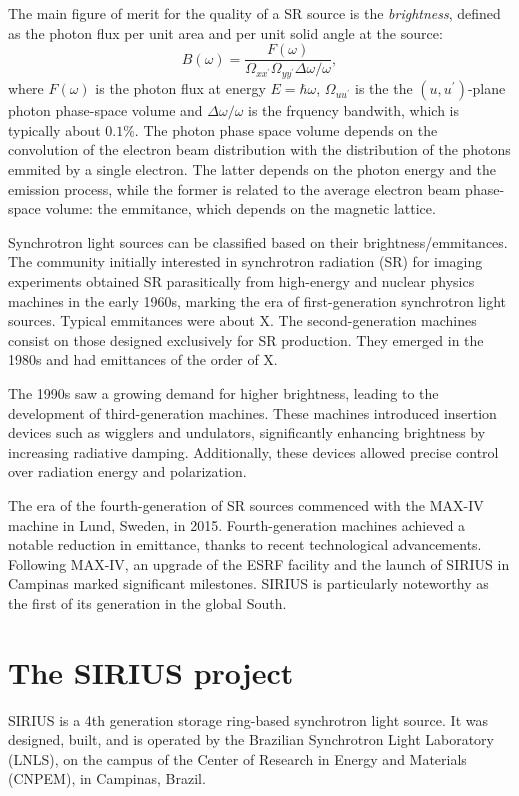 The main figure of merit for the quality of a SR source is the \textit{brightness}, defined as the photon flux per unit area and per unit solid angle at the source:
\begin{equation}
    B(\omega) = \frac{F(\omega)}{\Omega_{xx^\prime}\Omega_{yy^\prime}\Delta \omega/\omega},
\end{equation}
where $F(\omega)$ is the photon flux at energy $E=\hbar\omega$, $\Omega_{uu^\prime}$ is the the $(u,u^\prime)$-plane photon phase-space volume and $\Delta\omega/\omega$ is the frquency bandwith, which is typically about $0.1\%$. The photon phase space volume depends on the convolution of the electron beam distribution with the distribution of the photons emmited by a single electron. The latter depends on the photon energy and the emission process, while the former is related to the average electron beam phase-space volume: the emmitance, which depends on the magnetic lattice.

Synchrotron light sources can be classified based on their brightness/emmitances. The community initially interested in synchrotron radiation (SR) for imaging experiments obtained SR parasitically from high-energy and nuclear physics machines in the early 1960s, marking the era of first-generation synchrotron light sources. Typical emmitances were about X. The second-generation machines consist on those designed exclusively for SR production. They emerged in the 1980s and had emittances of the order of X.

The 1990s saw a growing demand for higher brightness, leading to the development of third-generation machines. These machines introduced insertion devices such as wigglers and undulators, significantly enhancing brightness by increasing radiative damping. Additionally, these devices allowed precise control over radiation energy and polarization.

The era of the fourth-generation of SR sources commenced with the MAX-IV machine in Lund, Sweden, in 2015. Fourth-generation machines achieved a notable reduction in emittance, thanks to recent technological advancements. Following MAX-IV, an upgrade of the ESRF facility and the launch of SIRIUS in Campinas marked significant milestones. SIRIUS is particularly noteworthy as the first of its generation in the global South.

\section{The SIRIUS project}
SIRIUS is a 4th generation storage ring-based synchrotron light source. It was designed, built, and is operated by the Brazilian Synchrotron Light Laboratory (LNLS), on the campus of the Center of Research in Energy and Materials (CNPEM), in Campinas, Brazil.

